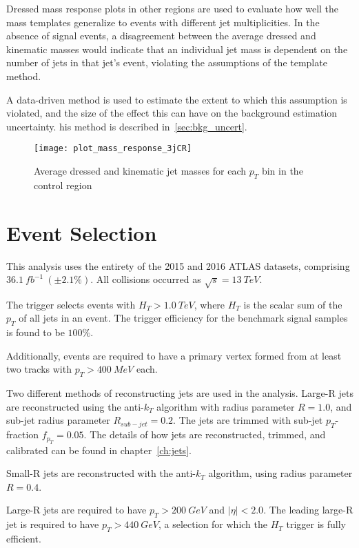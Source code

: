 Dressed mass response plots in other regions are used to evaluate how well the mass templates generalize to events with different jet multiplicities.
In the absence of signal events, a disagreement between the average dressed and kinematic masses would indicate that an individual jet mass is
dependent on the number of jets in that jet's event, violating the assumptions of the template method.

A data-driven method is used to estimate the extent to which this assumption is violated,
and the size of the effect this can have on the background estimation uncertainty.
his method is described in~\ref{sec:bkg_uncert}.

\begin{figure}[!ht]
    \texttt{[image: plot\_mass\_response\_3jCR]}
    \centering
    \caption{Average dressed and kinematic jet masses for each $p_T$ bin
    in the control region}
    \label{fig:response_3jCR}

\end{figure}

\section{Event Selection} \label{sec:event_selection}
This analysis uses the entirety of the 2015 and 2016 ATLAS datasets, comprising $36.1~fb^{-1}~(\pm2.1\%)$.
All collisions occurred as $\sqrt{s}=13~TeV$.

The trigger selects events with $H_{T}>1.0~TeV$, where $H_{T}$ is the scalar sum of the $p_{T}$ of all jets in an event.
The trigger efficiency for the benchmark signal samples is found to be $100\%$.

Additionally, events are required to have a primary vertex formed from at least two tracks with $p_{T}>400~MeV$ each.

Two different methods of reconstructing jets are used in the analysis.
Large-R jets are reconstructed using the anti-$k_{T}$ algorithm with radius parameter $R=1.0$,
and sub-jet radius parameter $R_{sub-jet}=0.2$.
The jets are trimmed with sub-jet $p_{T}$-fraction $f_{p_{T}}=0.05$.
The details of how jets are reconstructed, trimmed, and calibrated can be found in chapter~\ref{ch:jets}.

Small-R jets are reconstructed with the anti-$k_{T}$ algorithm, using radius parameter $R=0.4$.

Large-R jets are required to have $p_{T}>200~GeV$ and $|\eta|<2.0$.
The leading large-R jet is required to have $p_{T}>440~GeV$, a selection for which the $H_{T}$ trigger is fully efficient.

